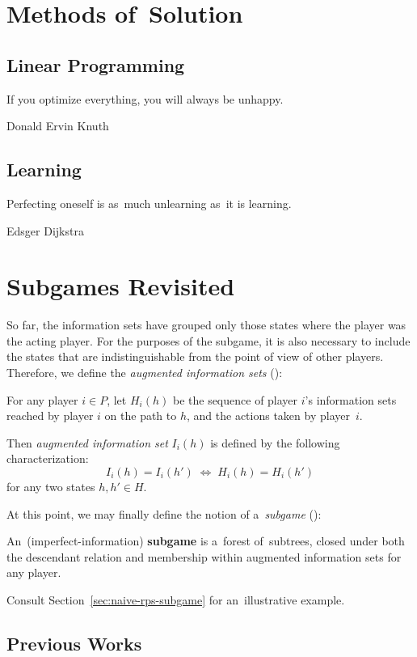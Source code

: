 \section{Methods of~Solution}

\subsection{Linear Programming}
{
  \setlength{\epigraphwidth}{0.65\textwidth}
  \epigraph{
    If you optimize everything, you will always be unhappy.
  }{Donald Ervin Knuth}
}%
\todo

\subsection{Learning}
{
  \setlength{\epigraphwidth}{0.65\textwidth}
  \epigraph{
    Perfecting oneself is as~much unlearning as~it is learning.
  }{Edsger Dijkstra}
}%
\todo

\section{Subgames Revisited}

So far, the information sets have grouped only those states where the player was the acting player.
For the purposes of the subgame, it is also necessary to include the states that are indistinguishable from the point of view of other players.
Therefore, we define the \emph{augmented information sets} (\cite{BurchJohansonBowling13}):
\begin{defn}
  For any player $i \in P$, let $H_i(h)$ be the sequence of player $i$'s information sets reached by player $i$ on the path to $h$, and the actions taken by player~$i$.

  Then \emph{augmented information set} $I_i(h)$ is defined by the following characterization:
  \[ I_i (h) = I_i (h') \; \Longleftrightarrow \; H_i (h) = H_i (h') \]
  for any two states $h, h' \in H$.
\end{defn}
At this point, we may finally define the notion of a~\emph{subgame} (\cite{BurchJohansonBowling13}):
\begin{defn}[subgame]
  \label{defn:subgame}
  An~(imperfect-information) \textbf{subgame} is a~forest of~subtrees, closed under both the descendant relation and membership within augmented information sets for any player.
\end{defn}
Consult Section~\ref{sec:naive-rps-subgame} for an~illustrative example.

\subsection{Previous Works}

